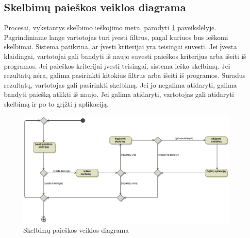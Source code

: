 \documentclass[12pt]{article}
\begin{document}
	\subsection{Skelbimų paieškos veiklos diagrama}
	Procesai, vykstantys skelbimo ieškojimo metu, parodyti \ref{SearchActivity} paveikslėlyje. Pagrindiniame lange vartotojas turi įvesti filtrus, pagal kuriuos bus ieškomi skelbimai. Sistema patikrina, ar įvesti kriterijai yra teisingai suvesti. Jei įvesta klaidingai, vartotojai gali bandyti iš naujo suvesti paieškos kriterijus arba išeiti iš programos. Jei paieškos kriterijai įvesti teisingai, sistema ieško skelbimų. Jei rezultatų nėra, galima pasirinkti kitokius filtrus arba išeiti iš programos. Suradus rezultatų, vartotojas gali pasirinkti skelbimą. Jei jo negalima atidaryti, galima bandyti paiešką atlikti iš naujo. Jei galima atidaryti, vartotojas gali atidaryti skelbimą ir po to grįžti į aplikaciją.
	\begin{figure}[h]
		\begin{center}
			\includegraphics[width=\textwidth]{PaieskosVeikla.eps}
			\caption{Skelbimų paieškos veiklos diagrama\label{SearchActivity}}
		\end{center}
	\end{figure}
	
	\pagebreak
	
\end{document}
